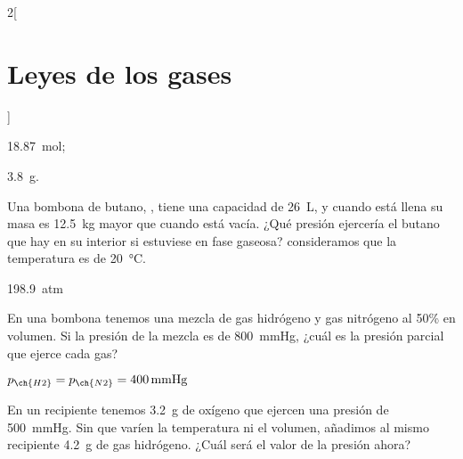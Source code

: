 \documentclass[10pt]{article}
\begin{document}
\begin{multicols}{2}[
  \section{Leyes de los gases}
  ]
  \begin{solution}
    \begin{enumerate*}
      \item \SI{18.87}{\mole};
      \item \SI{3.8}{\gram}.
    \end{enumerate*}
  \end{solution}




  \begin{exercise}[
      tags    = {termodinámica, entalpía, entalpia de reacción, calor},
      topics  = {química, termoquímica, termodinámica},
      source  = {FQ 1B SAN 2015, p67, e49},
    ]
    Una bombona de butano, , tiene una capacidad de \SI{26}{\liter}, y cuando está llena su masa es \SI{12.5}{\kilo\gram} mayor que cuando está vacía. ¿Qué presión ejercería el butano que hay en su interior si estuviese en fase gaseosa? consideramos que la temperatura es de \SI{20}{\celsius}.
  \end{exercise}

  \begin{solution}
    \SI{198.9}{atm}
  \end{solution}




  \begin{exercise}[
      tags    = {termodinámica, entalpía, entalpia de reacción, calor},
      topics  = {química, termoquímica, termodinámica},
      source  = {FQ 1B SAN 2015, p68, e56},
    ]
    En una bombona tenemos una mezcla de gas hidrógeno y gas nitrógeno al 50\% en volumen. Si la presión de la mezcla es de \SI{800}{\mmHg}, ¿cuál es la presión parcial que ejerce cada gas?
  \end{exercise}

  \begin{solution}
    \( p_{\ch{H2}} = p_{\ch{N2}} = \SI{400}{\mmHg} \)
  \end{solution}



  \begin{exercise}[
      tags    = {termodinámica, entalpía, entalpia de reacción, calor},
      topics  = {química, termoquímica, termodinámica},
      source  = {FQ 1B SAN 2015, p68, e57},
    ]
    En un recipiente tenemos \SI{3.2}{\gram} de oxígeno que ejercen una presión de \SI{500}{\mmHg}. Sin que varíen la temperatura ni el volumen, añadimos al mismo recipiente \SI{4.2}{\gram} de gas hidrógeno. ¿Cuál será el valor
    de la presión ahora?
  \end{exercise}


\end{multicols}
\end{document}

